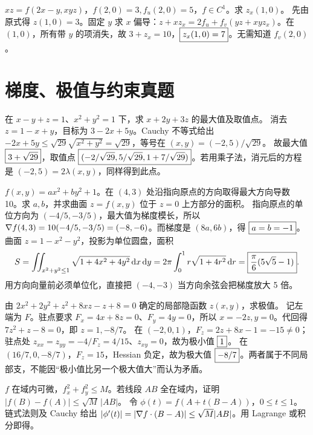 $xz=f(2x-y,xyz)$，$f(2,0)=3,f_u(2,0)=5$，$f\in C^1$。求 $z_x(1,0)$。
\sol 先由原式得 $z(1,0)=3$。固定 $y$ 求 $x$ 偏导：$z+xz_x=2f_u+f_v(yz+xyz_x)$。在 $(1,0)$，所有带 $y$ 的项消失，故 $3+z_x=10$，$\boxed{z_x(1,0)=7}$。无需知道 $f_v(2,0)$。

\section{梯度、极值与约束真题}
在 $x-y+z=1$、$x^2+y^2=1$ 下，求 $x+2y+3z$ 的最大值及取值点。
\sol 消去 $z=1-x+y$，目标为 $3-2x+5y$。Cauchy 不等式给出 $-2x+5y\le\sqrt{29}\sqrt{x^2+y^2}=\sqrt{29}$，等号在 $(x,y)=(-2,5)/\sqrt{29}$。
故最大值 $\boxed{3+\sqrt{29}}$，取值点 $\boxed{(-2/\sqrt{29},5/\sqrt{29},1+7/\sqrt{29})}$。若用乘子法，消元后的方程是 $(-2,5)=2\lambda(x,y)$，同样得到此点。

$f(x,y)=ax^2+by^2+1$。在 $(4,3)$ 处沿指向原点的方向取得最大方向导数 10。求 $a,b$，并求曲面 $z=f(x,y)$ 位于 $z=0$ 上方部分的面积。
\sol 指向原点的单位方向为 $(-4/5,-3/5)$，最大值为梯度模长，所以 $\nabla f(4,3)=10(-4/5,-3/5)=(-8,-6)$。而梯度是 $(8a,6b)$，得 $\boxed{a=b=-1}$。
曲面 $z=1-x^2-y^2$，投影为单位圆盘，面积
\[S=\iint_{x^2+y^2\le1}\sqrt{1+4x^2+4y^2}\,\mathrm d x\,\mathrm d y
=2\pi\int_0^1r\sqrt{1+4r^2}\,\mathrm d r=\boxed{\frac\pi6(5\sqrt5-1)}.\]
用方向向量前必须单位化，直接把 $(-4,-3)$ 当方向余弦会把梯度放大 5 倍。

由 $2x^2+2y^2+z^2+8xz-z+8=0$ 确定的局部隐函数 $z(x,y)$，求极值。
\sol 记左端为 $F$。驻点要求 $F_x=4x+8z=0$、$F_y=4y=0$，所以 $x=-2z,y=0$。代回得 $7z^2+z-8=0$，即 $z=1,-8/7$。
在 $(-2,0,1)$，$F_z=2z+8x-1=-15\ne0$；驻点处 $z_{xx}=z_{yy}=-4/F_z=4/15$、$z_{xy}=0$，故为极小值 $\boxed{1}$。
在 $(16/7,0,-8/7)$，$F_z=15$，Hessian 负定，故为极大值 $\boxed{-8/7}$。两者属于不同局部支，不能因“极小值比另一个极大值大”而认为矛盾。

$f$ 在域内可微，$f_x^2+f_y^2\le M$。若线段 $AB$ 全在域内，证明 $|f(B)-f(A)|\le\sqrt M\,|AB|$。
\sol 令 $\phi(t)=f(A+t(B-A))$，$0\le t\le1$。链式法则及 Cauchy 给出 $|\phi'(t)|=|\nabla f\cdot(B-A)|\le\sqrt M|AB|$。用 Lagrange 或积分即得。

